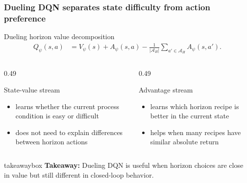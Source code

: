 \documentclass[aspectratio=169]{beamer}
\newcommand{\takeawaybox}[1]{%
\vspace{0.02cm}
\begin{center}
\begin{beamercolorbox}[wd=0.94\textwidth,sep=3pt,center,rounded=true,shadow=false]{takeawaybox}
\scriptsize
\textbf{\textcolor{maroon1}{Takeaway:}} #1
\end{beamercolorbox}
\end{center}
}
\begin{document}
\begin{frame}
\frametitle{\large \textbf{Dueling DQN separates state difficulty from action preference}}
\scriptsize

\begin{block}{Dueling horizon value decomposition}
\begin{align*}
Q_\psi(s,a)
&=V_\psi(s)+A_\psi(s,a)
-\frac{1}{|\mathcal{A}_H|}\sum_{a'\in\mathcal{A}_H}A_\psi(s,a').
\end{align*}
\end{block}

\begin{columns}[T,onlytextwidth]
\begin{column}{0.49\textwidth}
\begin{block}{State-value stream}
\begin{itemize}\justifying
  \setlength\itemsep{0.35ex}
  \item learns whether the current process condition is easy or difficult
  \item does not need to explain differences between horizon actions
\end{itemize}
\end{block}
\end{column}

\begin{column}{0.49\textwidth}
\begin{block}{Advantage stream}
\begin{itemize}\justifying
  \setlength\itemsep{0.35ex}
  \item learns which horizon recipe is better in the current state
  \item helps when many recipes have similar absolute return
\end{itemize}
\end{block}
\end{column}
\end{columns}

\takeawaybox{Dueling DQN is useful when horizon choices are close in value but still different in closed-loop behavior.}
\end{frame}
\end{document}
